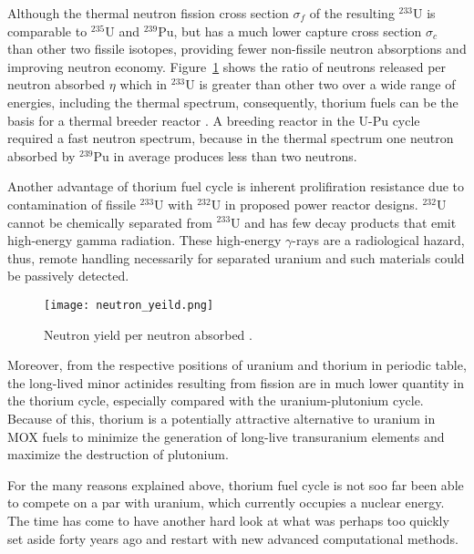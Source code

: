 Although the thermal neutron fission cross section $\sigma_f$ of the resulting $^{233}$U is comparable to $^{235}$U and $^{239}$Pu, but has a much lower capture cross section $\sigma_c$ than other two fissile isotopes, providing fewer non-fissile neutron absorptions and improving neutron economy. Figure~\ref{fig:n_yeild} shows the ratio of neutrons released per neutron absorbed $\eta$ which in $^{233}$U is greater than other two over a wide range of energies, including the thermal spectrum, consequently, thorium fuels can be the basis for a thermal breeder reactor \cite{iaea_thorium_2005}. A breeding reactor in the U-Pu cycle required a fast neutron spectrum, because in the thermal spectrum one neutron absorbed by $^{239}$Pu in average produces less than two neutrons.

Another advantage of thorium fuel cycle is inherent prolifiration resistance due to contamination of fissile $^{233}$U with $^{232}$U in proposed power reactor designs. $^{232}$U cannot be chemically separated from $^{233}$U and has few decay products that emit high-energy gamma radiation. These high-energy $\gamma$-rays are a radiological hazard, thus, remote handling necessarily for separated uranium and such materials could be passively detected.

\begin{figure}[htbp!] %
  \centering
  \vspace{-0.3em}
  \texttt{[image: neutron\_yeild.png]}
  \caption{Neutron yield per neutron absorbed \cite{anon_plutonium_1989}.}
  \vspace{-0.6em}
  \label{fig:n_yeild}
\end{figure}
\FloatBarrier

Moreover, from the respective positions of uranium and thorium in periodic table, the long-lived minor actinides resulting from fission are in much lower quantity in the thorium cycle, especially compared with the uranium-plutonium cycle. Because of this, thorium is a potentially attractive alternative to uranium in \gls{MOX} fuels to minimize the generation of long-live transuranium elements and maximize the destruction of plutonium.

For the many reasons explained above, thorium fuel cycle is not soo far been able to compete on a par with uranium, which currently occupies a nuclear energy. The
time has come to have another hard look at what was perhaps too quickly set aside forty years ago and restart with new advanced computational methods. 


